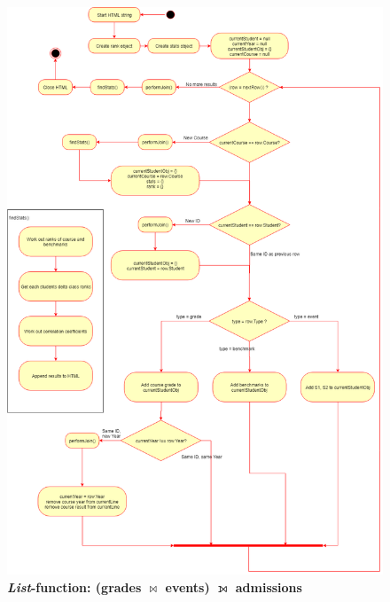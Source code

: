 \begin{figure}[H]
    \centering
    \begin{mdframed}
        \centering
        \includegraphics[scale=0.4]{./resources/figures/fig-listfn-correlation-events.png}
    \end{mdframed}
    \caption[\textit{List}-function: \texorpdfstring{(grades $\bowtie$ events) $\leftouterjoin$ admissions}{Lg}]{\textbf{\textit{List}-function: \texorpdfstring{(grades $\bowtie$ events) $\leftouterjoin$ admissions}{Lg}}}
    \label{fig-listfn-correlation-events}
\end{figure}


